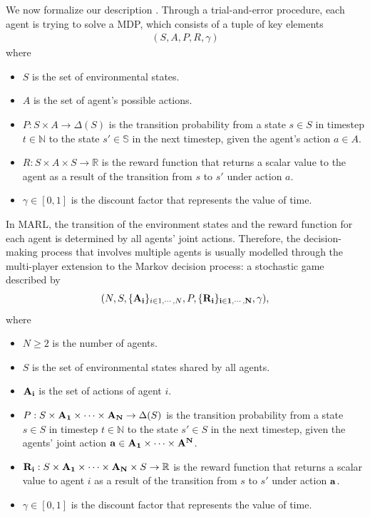 \documentclass[a4paper,11pt]{article}
\begin{document}
We now formalize our description \cite{yang2021overview}. Through a trial-and-error procedure, each agent is trying to solve a MDP, which consists of a tuple of key elements
\begin{align}
    ( S, A, P, R, \gamma )
\end{align}
where
\begin{itemize}
    \item $S$ is the set of environmental states.
    \item $A$ is the set of agent's possible actions.
    \item $P:S\times A\to \Delta(S)$ is the transition probability from a state $s\in S$ in timestep $t\in\mathbb{N}$ to the state $s'\in\mathbb{S}$ in the next timestep, given the agent's action $a\in A$.
    \item $R:S\times A\times S\to\mathbb{R}$ is the reward function that returns a scalar value to the agent as a result of the transition from $s$ to $s'$ under action $a$.
    \item $\gamma\in[0,1]$ is the discount factor that represents the value of time.
\end{itemize}

In MARL, the transition of the environment states and the reward function for each agent is determined by all agents' joint actions. Therefore, the decision-making process that involves multiple agents is usually modelled through the multi-player extension to the Markov decision process: a stochastic game described by
\begin{align}
    (N, S, \{{\bf{A_i}}\}_{i\in{1, \cdots, N}}, P,  \{\bf{R_i}\}_{i\in{1, \cdots, N}}, \gamma ),
\end{align}
where
\begin{itemize}
    \item $N\geq 2$ is the number of agents.
    \item $S$ is the set of environmental states shared by all agents.
    \item $\bf{A_i}$ is the set of actions of agent $i$.
    \item $P:S\times {\bf{A_1}}\times \cdots\times {\bf{A_N}} \to\Delta(S)$ is the transition probability from a state $s\in S$ in timestep $t\in\mathbb{N}$ to the state $s'\in S$ in the next timestep, given the agents' joint action ${\bf{a}}\in {\bf{A_1}}\times \cdots\times \bf{A^N}$.
    \item ${\bf{R_i}}:S\times {\bf{A_1}}\times \cdots\times {\bf{A_N}}\times S\to\mathbb{R}$ is the reward function that returns a scalar value to agent $i$ as a result of the transition from $s$ to $s'$ under action $\bf{a}$.
    \item $\gamma\in[0,1]$ is the discount factor that represents the value of time.
\end{itemize}
\end{document}
